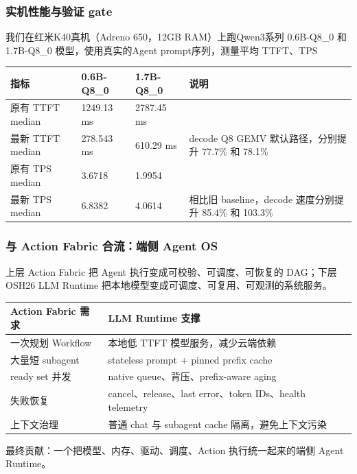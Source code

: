 \begin{frame}
  \frametitle{实机性能与验证 gate}

  \small
  我们在红米K40真机（Adreno 650，12GB RAM）上跑Qwen3系列 0.6B-Q8\_0 和 1.7B-Q8\_0 模型，使用真实的Agent prompt序列，测量平均 TTFT、TPS
  \scriptsize
  \begin{tabularx}{\textwidth}{p{}p{}p{}Y}
    \toprule
    指标 & 0.6B-Q8\_0 & 1.7B-Q8\_0 & 说明 \\
    \midrule
    原有 TTFT median & 1249.13 ms & 2787.45 ms &  \\
    最新 TTFT median & 278.543 ms & 610.29 ms & decode Q8 GEMV 默认路径，分别提升 77.7\% 和 78.1\% \\
    原有 TPS median & 3.6718 & 1.9954 &  \\
    最新 TPS median & 6.8382 & 4.0614 & 相比旧 baseline，decode 速度分别提升 85.4\% 和 103.3\% \\
    \bottomrule
  \end{tabularx}

  \vspace{0.4em}
  \footnotesize
\end{frame}

\begin{frame}
  \frametitle{与 Action Fabric 合流：端侧 Agent OS}
  \small
  上层 Action Fabric 把 Agent 执行变成可校验、可调度、可恢复的 DAG；下层 OSH26 LLM Runtime 把本地模型变成可调度、可复用、可观测的系统服务。

  \vspace{0.4em}
  \scriptsize
  \begin{tabularx}{\textwidth}{p{}Y}
    \toprule
    Action Fabric 需求 & LLM Runtime 支撑 \\
    \midrule
    一次规划 Workflow & 本地低 TTFT 模型服务，减少云端依赖 \\
    大量短 subagent & stateless prompt + pinned prefix cache \\
    ready set 并发 & native queue、背压、prefix-aware aging \\
    失败恢复 & cancel、release、last error、token IDs、health telemetry \\
    上下文治理 & 普通 chat 与 subagent cache 隔离，避免上下文污染 \\
    \bottomrule
  \end{tabularx}

  \vspace{0.45em}
  \normalsize
  最终贡献：一个把模型、内存、驱动、调度、Action 执行统一起来的端侧 Agent Runtime。
\end{frame}
